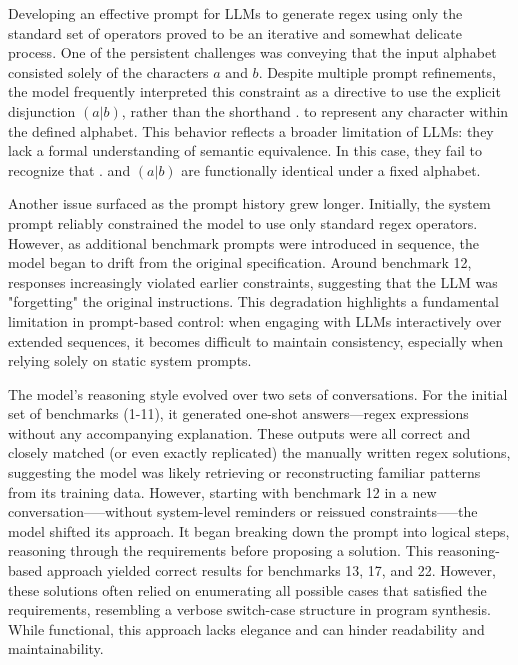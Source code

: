 \indent\indent Developing an effective prompt for LLMs to generate regex using only the standard set of operators proved to be an iterative and somewhat delicate process. One of the persistent challenges was conveying that the input alphabet consisted solely of the characters $a$ and $b$. Despite multiple prompt refinements, the model frequently interpreted this constraint as a directive to use the explicit disjunction $(a|b)$, rather than the shorthand $.$ to represent any character within the defined alphabet. This behavior reflects a broader limitation of LLMs: they lack a formal understanding of semantic equivalence. In this case, they fail to recognize that $.$ and $(a|b)$ are functionally identical under a fixed alphabet.

\indent\indent Another issue surfaced as the prompt history grew longer. Initially, the system prompt reliably constrained the model to use only standard regex operators. However, as additional benchmark prompts were introduced in sequence, the model began to drift from the original specification. Around benchmark 12, responses increasingly violated earlier constraints, suggesting that the LLM was "forgetting" the original instructions. This degradation highlights a fundamental limitation in prompt-based control: when engaging with LLMs interactively over extended sequences, it becomes difficult to maintain consistency, especially when relying solely on static system prompts.

\indent\indent The model's reasoning style evolved over two sets of conversations. For the initial set of benchmarks (1-11), it generated one-shot answers—regex expressions without any accompanying explanation. These outputs were all correct and closely matched (or even exactly replicated) the manually written regex solutions, suggesting the model was likely retrieving or reconstructing familiar patterns from its training data. However, starting with benchmark 12 in a new conversation--—without system-level reminders or reissued constraints--—the model shifted its approach. It began breaking down the prompt into logical steps, reasoning through the requirements before proposing a solution. This reasoning-based approach yielded correct results for benchmarks 13, 17, and 22. However, these solutions often relied on enumerating all possible cases that satisfied the requirements, resembling a verbose switch-case structure in program synthesis. While functional, this approach lacks elegance and can hinder readability and maintainability.

